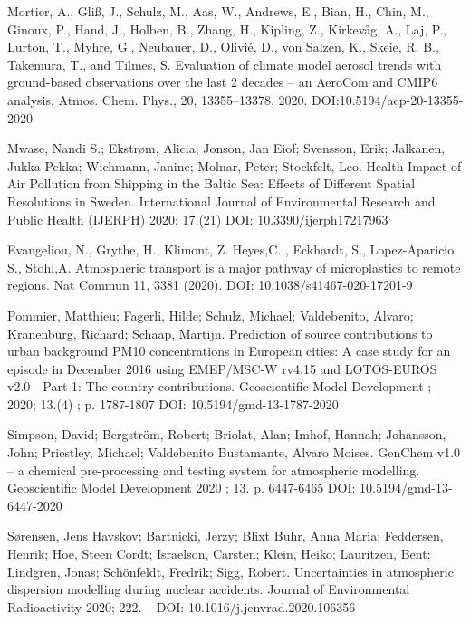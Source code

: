 \begin{list}{}{\setlength{\leftmargin}{15pt}\setlength{\itemindent}{-\leftmargin}}
\item[]
Mortier, A., Gliß, J., Schulz, M., Aas, W., Andrews, E., Bian, H., Chin, M., Ginoux, P., Hand, J., Holben, B., Zhang, H., Kipling, Z., Kirkevåg, A., Laj, P., Lurton, T., Myhre, G., Neubauer, D., Olivié, D., von Salzen, K., Skeie, R. B., Takemura, T., and Tilmes, S.
Evaluation of climate model aerosol trends with ground-based observations over the last 2 decades – an AeroCom and CMIP6 analysis, 
Atmos. Chem. Phys., 20, 13355–13378, 2020.
DOI:10.5194/acp-20-13355-2020

\item[]
Mwase, Nandi S.; Ekstrøm, Alicia; Jonson, Jan Eiof; Svensson, Erik; Jalkanen, Jukka-Pekka; Wichmann, Janine; Molnar, Peter; Stockfelt, Leo.
Health Impact of Air Pollution from Shipping in the Baltic Sea: Effects of Different Spatial Resolutions in Sweden.
International Journal of Environmental Research and Public Health (IJERPH) 2020; 17.(21)
DOI: 10.3390/ijerph17217963 

\item[]
Evangeliou, N., Grythe, H., Klimont, Z.  Heyes,C. , Eckhardt, S., Lopez-Aparicio, S., Stohl,A. 
Atmospheric transport is a major pathway of microplastics to remote regions. 
Nat Commun 11, 3381 (2020). 
DOI: 10.1038/s41467-020-17201-9

\item[]
Pommier, Matthieu; Fagerli, Hilde; Schulz, Michael; Valdebenito, Alvaro; Kranenburg, Richard; Schaap, Martijn.
Prediction of source contributions to urban background PM10 concentrations in European cities: A case study for an episode in December 2016 using EMEP/MSC-W rv4.15 and LOTOS-EUROS v2.0 - Part 1: The country contributions.
Geoscientific Model Development ; 2020; 13.(4) ; p. 1787-1807
DOI: 10.5194/gmd-13-1787-2020 

\item[]
Simpson, David; Bergström, Robert; Briolat, Alan; Imhof, Hannah; Johansson, John; Priestley, Michael;
Valdebenito Bustamante, Alvaro Moises.
GenChem v1.0 – a chemical pre-processing and testing system for atmospheric modelling.
Geoscientific Model Development 2020 ; 13. p. 6447-6465
DOI: 10.5194/gmd-13-6447-2020 

\item[]
Sørensen, Jens Havskov; Bartnicki, Jerzy; Blixt Buhr, Anna Maria; Feddersen, Henrik; Hoe, Steen Cordt; Israelson, Carsten; Klein, Heiko; Lauritzen, Bent; Lindgren, Jonas; Schönfeldt, Fredrik; Sigg, Robert.
Uncertainties in atmospheric dispersion modelling during nuclear accidents.
Journal of Environmental Radioactivity 2020; 222. –
DOI: 10.1016/j.jenvrad.2020.106356 


\end{list}
